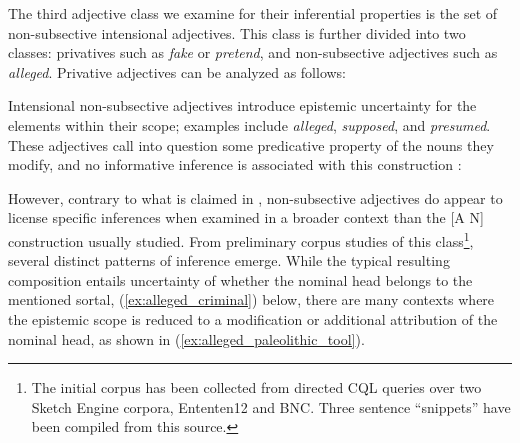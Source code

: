 \documentclass[10pt]{article}
\begin{document}
\vspace {-1.5mm}


The third adjective class we examine for their inferential properties is the set of non-subsective intensional adjectives. 
% 
% 
%
This class is further divided into two classes: privatives such as {\it fake} or {\it pretend}, and non-subsective adjectives such as \emph{alleged}. 
Privative adjectives can be analyzed as follows:
\vspace{-0.5em}
\vspace{-0.5em}

\noindent
Intensional non-subsective adjectives introduce epistemic uncertainty for the elements within their scope; 
examples include \emph{alleged}, \emph{supposed}, and \emph{presumed}. These adjectives call 
into question some predicative property of the nouns they modify, and no informative inference is associated with this construction \cite{Kamp95prototypetheory}:
\vspace{-.5em}
\vspace{-0.5em}

\noindent However, contrary to what is claimed in \cite{amoia2006adjective}, non-subsective adjectives do appear to license specific inferences when examined in a broader context than the [A N] construction usually studied. From preliminary corpus studies of this class\footnote{The initial corpus has been collected from directed CQL queries over  two Sketch Engine corpora, Ententen12 and BNC. Three sentence ``snippets'' have been compiled from this source.}, several distinct patterns of inference emerge. While the typical resulting composition entails  uncertainty of 
 whether the nominal head belongs to the mentioned sortal, (\ref{ex:alleged_criminal}) below, there are many contexts where the epistemic scope is reduced to  a modification or additional attribution of the nominal head, as shown in  (\ref{ex:alleged_paleolithic_tool}). 

\vspace{-0.5em}
\vspace{-0.5em}
\end{document}
